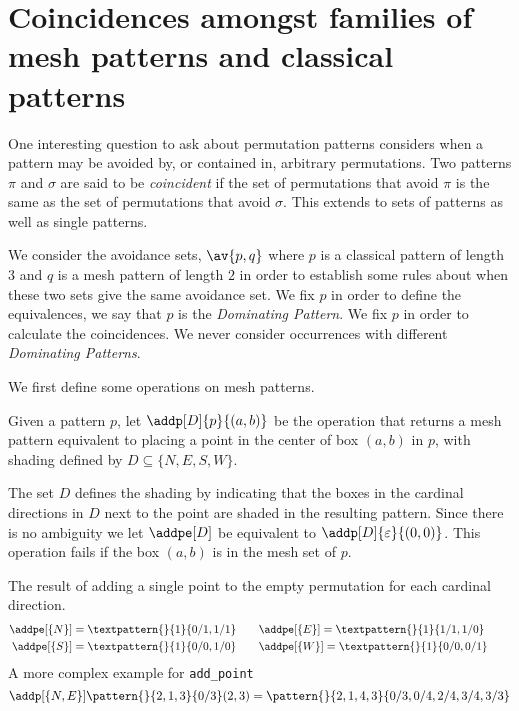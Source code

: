 \chapter{Coincidences amongst families of mesh patterns and classical patterns}
One interesting question to ask about permutation patterns considers when a
pattern may be avoided by, or contained in, arbitrary permutations. Two
patterns \(\pi\) and \(\sigma\) are said to be \emph{coincident} if the set
of permutations that avoid \(\pi\) is the same as the set of permutations that
avoid \(\sigma\). This extends to sets of patterns as well as single patterns.

We consider the avoidance sets, \(\av{p,q}\) where \(p\) is a classical pattern
of length \(3\) and \(q\) is a mesh pattern of length \(2\) in order to
establish some rules about when these two sets give the same avoidance set.
We fix \(p\) in order to define the equivalences, we say that \(p\) is the
\emph{Dominating Pattern}. We fix \(p\) in order to calculate the coincidences.
We never consider occurrences with different \emph{Dominating Patterns}.

We first define some operations on mesh patterns.
\begin{definition}
Given a pattern \(p\), let \(\addp[D]{p}{(a,b)}\) be the operation that returns
a mesh pattern equivalent to placing a point in the center of box \((a,b)\) in
\(p\), with shading defined by \(D\subseteq\{N,E,S,W\}\).
\end{definition}
The set \(D\) defines the shading by indicating that the boxes in the cardinal
directions in \(D\) next to the point are shaded in the resulting pattern.
Since there is no ambiguity we let \(\addpe[D]\) be equivalent to \(\addp[D]{\varepsilon}{(0,0)}\).
This operation fails if the box \((a,b)\) is in the mesh set of \(p\).

\begin{example}
    The result of adding a single point to the empty permutation for each cardinal direction.
 \begin{align*}
     \addpe[\{N\}] = \textpattern{}{1}{0/1,1/1} &\qquad\addpe[\{E\}] =\textpattern{}{1}{1/1,1/0} \qquad \\
     \addpe[\{S\}] = \textpattern{}{1}{0/0,1/0} &\qquad\addpe[\{W\}] =\textpattern{}{1}{0/0,0/1} \qquad
\end{align*}
    A more complex example for \texttt{add\_point}
\begin{equation*}
\addp[\{N,E\}]{\pattern{}{2,1,3}{0/3}}{(2,3)} = \pattern{}{2,1,4,3}{0/3,0/4,2/4,3/4,3/3}
\end{equation*}
\end{example}

